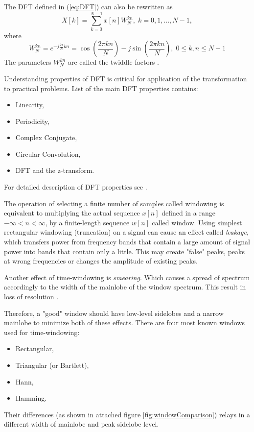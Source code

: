 \documentclass[twoside]{ctuthesis}
\theoremstyle{plain}
\theoremstyle{definition}
\theoremstyle{note}
\begin{document}
The DFT defined in (\ref{eq:DFT}) can also be rewritten as
\begin{equation} \label{eq:DFT2}
	X[k]=\sum_{k=0}^{N-1}x[n]W^{kn}_{N},\; k = 0, 1, ..., N-1,
\end{equation}
where
\begin{equation} \label{eq:Twiddle}
	W^{kn}_{N}=e^{-j \frac{2 \pi}{N} kn}=\cos(\frac{2\pi kn}{N})-j\sin(\frac{2\pi kn}{N}), \;0\leq k,n\leq N-1
\end{equation}
The parameters $W^{kn}_{N}$ are called the twiddle factors \cite{cite:RT_DSP}.
\par
Understanding properties of DFT is critical for application of the transformation to practical problems. List of the main DFT properties contains:
\begin{itemize}
	\setlength{\itemsep}{5pt}
	\item Linearity,
	
	\item Periodicity,
	
	\item Complex Conjugate,
	
	\item Circular Convolution,
	
	\item DFT and the z-transform.
\end{itemize}
For detailed description of DFT properties see \cite{cite:2,cite:RT_DSP}.

The operation of selecting a finite number of samples called windowing is equivalent to multiplying the actual sequence $x[n]$ defined in a range $-\infty < n < \infty$, by a finite-length sequence $w[n]$ called window. Using simplest rectangular windowing (truncation) on a signal can cause an effect called \textit{leakage}, which transfers power from frequency bands that contain a large amount of signal power into bands that contain only a little. This may create "false" peaks, peaks at wrong frequencies or changes the amplitude of existing peaks. 

Another effect of time-windowing is \textit{smearing}. Which causes a spread of spectrum accordingly to the width of the mainlobe of the window spectrum. This result in loss of resolution \cite{cite:3} .

Therefore, a "good" window should have low-level sidelobes and a narrow mainlobe to minimize both of these effects. There are four most known windows used for time-windowing: 
\begin{itemize}
	\setlength{\itemsep}{5pt}
	\item Rectangular,
	
	\item Triangular (or Bartlett),
	
	\item Hann,
	
	\item Hamming.
\end{itemize}    
Their differences (as shown in attached figure \ref{fig:windowComparison}) relays in a different width of mainlobe and peak sidelobe level.
\end{document}
